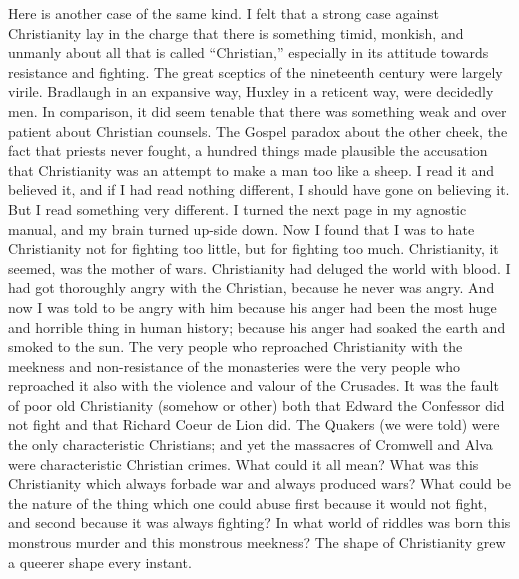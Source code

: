 \documentclass{book}
\begin{document}
Here is another case of the same kind. I felt that a strong case against Christianity lay in the charge that there is something timid, monkish, and unmanly about all that is called “Christian,” especially in its attitude towards resistance and fighting. The great sceptics of the nineteenth century were largely virile. Bradlaugh in an expansive way, Huxley in a reticent way, were decidedly men. In comparison, it did seem tenable that there was something weak and over patient about Christian counsels. The Gospel paradox about the other cheek, the fact that priests never fought, a hundred things made plausible the accusation that Christianity was an attempt to make a man too like a sheep. I read it and believed it, and if I had read nothing different, I should have gone on believing it. But I read something very different. I turned the next page in my agnostic manual, and my brain turned up-side down. Now I found that I was to hate Christianity not for fighting too little, but for fighting too much. Christianity, it seemed, was the mother of wars. Christianity had deluged the world with blood. I had got thoroughly angry with the Christian, because he never was angry. And now I was told to be angry with him because his anger had been the most huge and horrible thing in human history; because his anger had soaked the earth and smoked to the sun. The very people who reproached Christianity with the meekness and non-resistance of the monasteries were the very people who reproached it also with the violence and valour of the Crusades. It was the fault of poor old Christianity (somehow or other) both that Edward the Confessor did not fight and that Richard Coeur de Lion did. The Quakers (we were told) were the only characteristic Christians; and yet the massacres of Cromwell and Alva were characteristic Christian crimes. What could it all mean? What was this Christianity which always forbade war and always produced wars? What could be the nature of the thing which one could abuse first because it would not fight, and second because it was always fighting? In what world of riddles was born this monstrous murder and this monstrous meekness? The shape of Christianity grew a queerer shape every instant.
\end{document}
